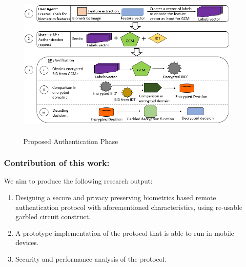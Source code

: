 \documentclass[10pt]{article}
\begin{document}
\begin{figure}[H]
\centering
\includegraphics[height=3.00in,width=5.00in]{authentication}
\caption{Proposed Authentication Phase}
\label{example}
\end{figure}

\pagebreak
\subsubsection*{Contribution of this work:}
We aim to produce the following research output:
\begin{enumerate}
 \item Designing a secure and privacy preserving biometrics based remote authentication protocol with aforementioned characteristics, using re-usable 
garbled circuit construct. 
 \item A prototype implementation of the protocol that is able to run in mobile devices.
 \item Security and performance analysis of the protocol.
\end{enumerate}

\footnotesize


 
\end{document}
